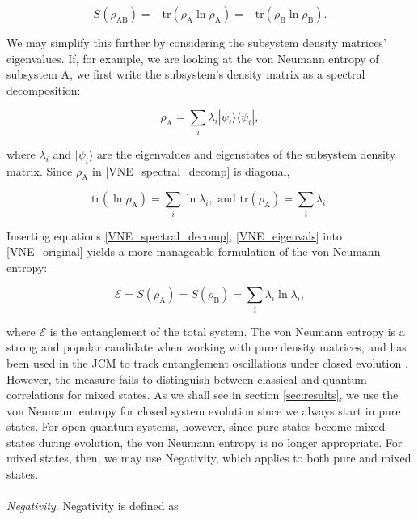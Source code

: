 \documentclass[12pt]{article}
\begin{document}
\begin{equation} \label{VNE_original}
    S(\rho_{\scriptscriptstyle \text{AB}}) = -\text{tr}(\rho_{\scriptscriptstyle \text{A}}\ln\rho_{\scriptscriptstyle \text{A}}) = -\text{tr}(\rho_{\scriptscriptstyle \text{B}}\ln\rho_{\scriptscriptstyle \text{B}}).
\end{equation}

We may simplify this further by considering the subsystem density matrices' eigenvalues. If, for example, we are looking at the von Neumann entropy of subsystem A, we first write the subsystem's density matrix as a spectral decomposition:

\begin{equation} \label{VNE_spectral_decomp}
    \rho_{\scriptscriptstyle \text{A}} = \sum_i \lambda_i|\psi_i\rangle\langle\psi_i|, 
\end{equation}

where $\lambda_i$ and $|\psi_i\rangle$ are the eigenvalues and eigenstates of the subsystem density matrix. Since $\rho_{\scriptscriptstyle \text{A}}$ in \eqref{VNE_spectral_decomp} is diagonal,

\begin{equation} \label{VNE_eigenvals}
\text{tr}(\ln\rho_{\scriptscriptstyle \text{A}}) = \sum_i \ln\lambda_i,\text{ and } \text{tr}(\rho_{\scriptscriptstyle \text{A}}) = \sum_i \lambda_i.
\end{equation}

Inserting equations \eqref{VNE_spectral_decomp}, \eqref{VNE_eigenvals} into \eqref{VNE_original} yields a more manageable formulation of the von Neumann entropy:

\begin{equation}
    \mathcal{E} = S(\rho_{\scriptscriptstyle \text{A}}) = S(\rho_{\scriptscriptstyle \text{B}}) = \sum_i \lambda_i\ln\lambda_i,
\end{equation}

where $\mathcal{E}$ is the entanglement of the total system. The von Neumann entropy is a strong and popular candidate when working with pure density matrices, and has been used in the JCM to track entanglement oscillations under closed evolution \cite{Entanglement2009-REE_VNapplied}. However, the measure fails to distinguish between classical and quantum correlations for mixed states. As we shall see in section \ref{sec:results}, we use the von Neumann entropy for closed system evolution since we always start in pure states. For open quantum systems, however, since pure states become mixed states during evolution, the von Neumann entropy is no longer appropriate. For mixed states, then, we may use Negativity, which applies to both pure and mixed states. \\
\\
\textit{Negativity}. Negativity is defined as
\end{document}
